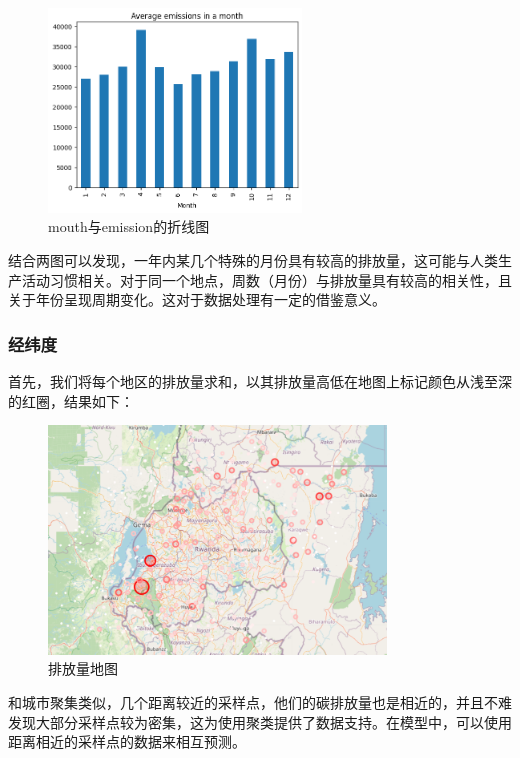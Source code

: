 \documentclass{ctexart}
\begin{document}
\begin{figure}[H]
      \centering
      \includegraphics[width=0.6\textwidth]{output3.png}
      \caption{mouth与emission的折线图}
\end{figure}

结合两图可以发现，一年内某几个特殊的月份具有较高的排放量，这可能与人类生产活动习惯相关。对于同一个地点，周数（月份）与排放量具有较高的相关性，且关于年份呈现周期变化。这对于数据处理有一定的借鉴意义。

\subsubsection{经纬度}

首先，我们将每个地区的排放量求和，以其排放量高低在地图上标记颜色从浅至深的红圈，结果如下：

\begin{figure}[H]
      \centering
      \includegraphics[width=0.8\textwidth]{output4.png}
      \caption{排放量地图}
\end{figure}

和城市聚集类似，几个距离较近的采样点，他们的碳排放量也是相近的，并且不难发现大部分采样点较为密集，这为使用聚类提供了数据支持。在模型中，可以使用距离相近的采样点的数据来相互预测。
\end{document}
